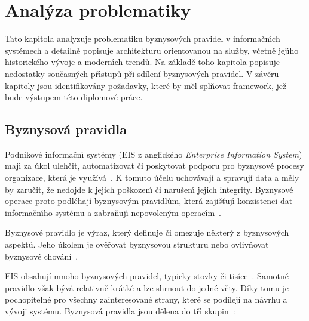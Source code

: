 
\chapter{Anal\'yza problematiky}\label{ch:analyza}

Tato kapitola analyzuje problematiku byznysov\'ych pravidel v informačn\'{\i}ch systémech
a detailně popisuje architekturu orientovanou na služby, včetně jej\'{\i}ho historického
v\'yvoje a modern\'{\i}ch trendů. Na základě toho kapitola popisuje nedostatky
současn\'ych př\'{\i}stupů při sdílení byznysových pravidel. V závěru kapitoly jsou
identifikovány požadavky, které by měl splňovat framework, jež bude v\'ystupem této diplomové práce.

\section{Byznysová pravidla}\label{sec:business-rules}

Podnikové informačn\'{\i} systémy (\gls{EIS} z anglického \textit{Enterprise Information System})
maj\'{\i} za úkol ulehčit, automatizovat či poskytovat podporu pro byznysové procesy organizace,
která je využívá~\cite{dumas2005process}. K tomuto účelu uchovávají a spravují data a měly by zaručit,
že nedojde k jejich poškozen\'{\i} či narušen\'{\i} jejich integrity. Byznysové operace proto
podléhají byznysov\'ym pravidlům, která zajišťuj\'{\i} konzistenci dat informačn\'{\i}ho systému a
zabraňuj\'{\i} nepovolen\'ym operac\'{\i}m~\cite{cemus2015automated}.

\begin{definition}
    Byznysové pravidlo je výraz, který definuje či omezuje některý z byznysových aspektů.
    Jeho úkolem je ověřovat byznysovou strukturu nebo ovlivňovat byznysové chování~\cite{morgan2002business}.
\end{definition}


\gls{EIS} obsahují mnoho byznysových pravidel, typicky stovky či tisíce~\cite{morgan2002business}.
Samotné pravidlo však bývá relativně krátké a lze shrnout do jedné věty. Díky tomu je pochopitelné
pro všechny zainteresované strany, které se podílejí na návrhu a vývoji systému.
Byznysová pravidla jsou dělena do tř\'{\i} skupin~\cite{cemus2014aspect}:


